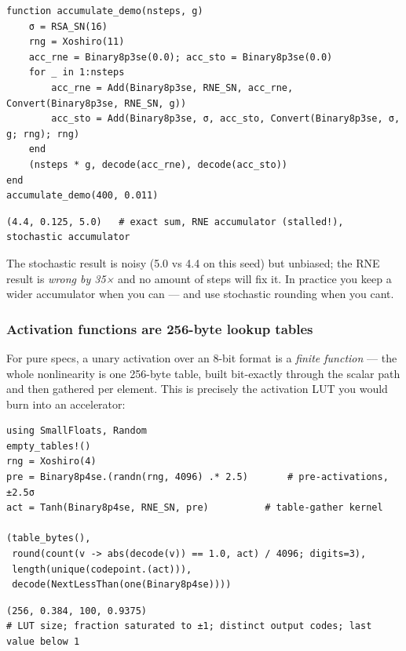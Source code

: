 \nopagebreak[4]
\begin{minipage}{\linewidth}
\begin{verbatim}
function accumulate_demo(nsteps, g)
    σ = RSA_SN(16)
    rng = Xoshiro(11)
    acc_rne = Binary8p3se(0.0); acc_sto = Binary8p3se(0.0)
    for _ in 1:nsteps
        acc_rne = Add(Binary8p3se, RNE_SN, acc_rne, Convert(Binary8p3se, RNE_SN, g))
        acc_sto = Add(Binary8p3se, σ, acc_sto, Convert(Binary8p3se, σ, g; rng); rng)
    end
    (nsteps * g, decode(acc_rne), decode(acc_sto))
end
accumulate_demo(400, 0.011)
\end{verbatim}




\begin{verbatim}
(4.4, 0.125, 5.0)   # exact sum, RNE accumulator (stalled!), stochastic accumulator
\end{verbatim}
\end{minipage}




The stochastic result is noisy (5.0 vs 4.4 on this seed) but unbiased; the RNE result is \emph{wrong by 35×} and no amount of steps will fix it. In practice you keep a wider accumulator when you can — and use stochastic rounding when you can{\textquotesingle}t.



\subsubsection{Activation functions are 256-byte lookup tables}



\label{12405290678054954100}{}


For pure specs, a unary activation over an 8-bit format is a \emph{finite function} — the whole nonlinearity is one 256-byte table, built bit-exactly through the scalar path and then gathered per element. This is precisely the activation LUT you would burn into an accelerator:




\nopagebreak[4]
\begin{minipage}{\linewidth}
\begin{verbatim}
using SmallFloats, Random
empty_tables!()
rng = Xoshiro(4)
pre = Binary8p4se.(randn(rng, 4096) .* 2.5)       # pre-activations, ±2.5σ
act = Tanh(Binary8p4se, RNE_SN, pre)          # table-gather kernel

(table_bytes(),
 round(count(v -> abs(decode(v)) == 1.0, act) / 4096; digits=3),
 length(unique(codepoint.(act))),
 decode(NextLessThan(one(Binary8p4se))))
\end{verbatim}




\begin{verbatim}
(256, 0.384, 100, 0.9375)
# LUT size; fraction saturated to ±1; distinct output codes; last value below 1
\end{verbatim}
\end{minipage}




